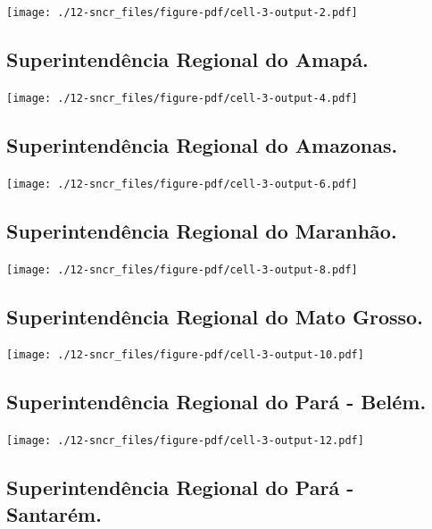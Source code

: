 \documentclass[
  letterpaper,
]{report}
\begin{document}
\texttt{[image: ./12-sncr\_files/figure-pdf/cell-3-output-2.pdf]}

\hypertarget{superintenduxeancia-regional-do-amapuxe1.-2}{%
\subsection{Superintendência Regional do
Amapá.}\label{superintenduxeancia-regional-do-amapuxe1.-2}}

\texttt{[image: ./12-sncr\_files/figure-pdf/cell-3-output-4.pdf]}

\hypertarget{superintenduxeancia-regional-do-amazonas.-2}{%
\subsection{Superintendência Regional do
Amazonas.}\label{superintenduxeancia-regional-do-amazonas.-2}}

\texttt{[image: ./12-sncr\_files/figure-pdf/cell-3-output-6.pdf]}

\hypertarget{superintenduxeancia-regional-do-maranhuxe3o.-2}{%
\subsection{Superintendência Regional do
Maranhão.}\label{superintenduxeancia-regional-do-maranhuxe3o.-2}}

\texttt{[image: ./12-sncr\_files/figure-pdf/cell-3-output-8.pdf]}

\hypertarget{superintenduxeancia-regional-do-mato-grosso.-2}{%
\subsection{Superintendência Regional do Mato
Grosso.}\label{superintenduxeancia-regional-do-mato-grosso.-2}}

\texttt{[image: ./12-sncr\_files/figure-pdf/cell-3-output-10.pdf]}

\hypertarget{superintenduxeancia-regional-do-paruxe1---beluxe9m.-2}{%
\subsection{Superintendência Regional do Pará -
Belém.}\label{superintenduxeancia-regional-do-paruxe1---beluxe9m.-2}}

\texttt{[image: ./12-sncr\_files/figure-pdf/cell-3-output-12.pdf]}

\hypertarget{superintenduxeancia-regional-do-paruxe1---santaruxe9m.-2}{%
\subsection{Superintendência Regional do Pará -
Santarém.}\label{superintenduxeancia-regional-do-paruxe1---santaruxe9m.-2}}
\end{document}
